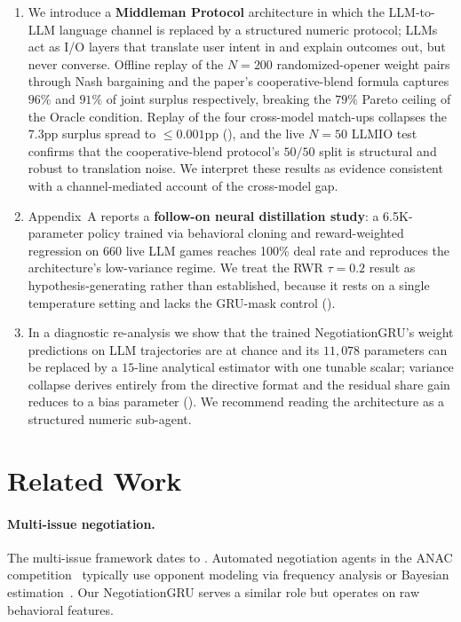 \documentclass[11pt,a4paper]{article}
\begin{document}
\begin{enumerate}
\item We introduce a \textbf{Middleman Protocol} architecture in which the LLM-to-LLM language channel is replaced by a structured numeric protocol; LLMs act as I/O layers that translate user intent in and explain outcomes out, but never converse. Offline replay of the $N\!=\!200$ randomized-opener weight pairs through Nash bargaining and the paper's cooperative-blend formula captures $96\%$ and $91\%$ of joint surplus respectively, breaking the $79\%$ Pareto ceiling of the Oracle condition. Replay of the four cross-model match-ups collapses the $7.3$pp surplus spread to $\le 0.001$pp (), and the live $N\!=\!50$ LLMIO test confirms that the cooperative-blend protocol's $50/50$ split is structural and robust to translation noise. We interpret these results as evidence consistent with a channel-mediated account of the cross-model gap.
\item Appendix~A reports a \textbf{follow-on neural distillation study}: a 6.5K-parameter policy trained via behavioral cloning and reward-weighted regression on 660 live LLM games reaches 100\% deal rate and reproduces the architecture's low-variance regime. We treat the RWR $\tau=0.2$ result as hypothesis-generating rather than established, because it rests on a single temperature setting and lacks the GRU-mask control ().
\item In a diagnostic re-analysis we show that the trained NegotiationGRU's weight predictions on LLM trajectories are at chance and its $11{,}078$ parameters can be replaced by a $15$-line analytical estimator with one tunable scalar; variance collapse derives entirely from the directive format and the residual share gain reduces to a bias parameter (). We recommend reading the architecture as a structured numeric sub-agent.
\end{enumerate}

\section{Related Work}
\label{sec:related}

\paragraph{Multi-issue negotiation.}
The multi-issue framework dates to \citet{raiffa1982art}. Automated negotiation agents in the ANAC competition~\citep{baarslag2015anac} typically use opponent modeling via frequency analysis or Bayesian estimation~\citep{baarslag2013acceptance}. Our NegotiationGRU serves a similar role but operates on raw behavioral features.
\end{document}
